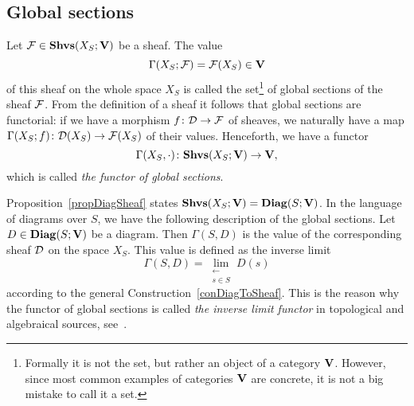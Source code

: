 \subsection{Global sections}

\begin{con}\label{conGlobalSections}
Let $\mathcal{F}\in\mathbf{Shvs}(X_S;\mathbf{V})$ be a sheaf. The value
\[
\Gamma(X_S;\mathcal{F})=\mathcal{F}(X_S)\in\mathbf{V}
\]
of this sheaf on the whole space $X_S$ is called the set\footnote{Formally it is not the set, but rather an object of a category $\mathbf{V}$. However, since most common examples of categories $\mathbf{V}$ are concrete, it is not a big mistake to call it a set.} of global sections of the sheaf $\mathcal{F}$. From the definition of a sheaf it follows that global sections are functorial: if we have a morphism $f\colon \mathcal{D}\to\mathcal{F}$ of sheaves, we naturally have a map $\Gamma(X_S;f)\colon \mathcal{D}(X_S)\to\mathcal{F}(X_S)$ of their values. Henceforth, we have a functor
\begin{equation}\label{eqFunctorOfGlobalSects}
\Gamma(X_S,\cdot)\colon \mathbf{Shvs}(X_S;\mathbf{V})\to \mathbf{V},
\end{equation}
which is called \emph{the functor of global sections}.
\end{con}

\begin{con}\label{conInverseLimit}
Proposition~\ref{propDiagSheaf} states $\mathbf{Shvs}(X_S;\mathbf{V})=\mathbf{Diag}(S;\mathbf{V})$. In the language of diagrams over $S$, we have the following description of the global sections. Let $D\in \mathbf{Diag}(S;\mathbf{V})$ be a diagram. Then $\Gamma(S,D)$ is the value of the corresponding sheaf $\mathcal{D}$ on the space $X_S$. This value is defined as the inverse limit
\[
\Gamma(S,D)=\lim\limits_{\substack{\leftarrow \\ s\in S}}D(s)
\]
according to the general Construction~\ref{conDiagToSheaf}. This is the reason why the functor of global sections is called \emph{the inverse limit functor} in topological and algebraical sources, see~\cite{careil1956homalg, grothendieck1957tohoku}.
\end{con}

